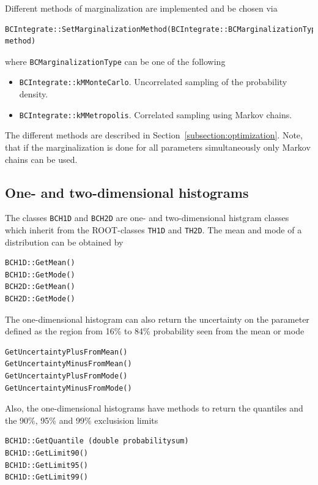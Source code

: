 \documentclass[11pt, a4paper]{article}
\begin{document}
\noindent 
Different methods of marginalization are implemented and be chosen via
%
\begin{verbatim}
BCIntegrate::SetMarginalizationMethod(BCIntegrate::BCMarginalizationType method)
\end{verbatim} 

\noindent
where \verb|BCMarginalizationType| can be one of the following 
% 
\begin{itemize}
\item \verb|BCIntegrate::kMMonteCarlo|. Uncorrelated sampling of the
 probability density.  
\item \verb|BCIntegrate::kMMetropolis|. Correlated sampling using
 Markov chains.
\end{itemize} 

\noindent 
The different methods are described in
Section~\ref{subsection:optimization}. Note, that if the
marginalization is done for all parameters simultaneously only Markov
chains can be used. \\


\subsection{One- and two-dimensional histograms} 

The classes \verb|BCH1D| and \verb|BCH2D| are one- and two-dimensional
histgram classes which inherit from the ROOT-classes \verb|TH1D| and
\verb|TH2D|. The mean and mode of a distribution can be obtained by 
%
\begin{verbatim}
BCH1D::GetMean()
BCH1D::GetMode()
BCH2D::GetMean()
BCH2D::GetMode()
\end{verbatim} 

\noindent 
The one-dimensional histogram can also return the uncertainty on the
parameter defined as the region from 16\% to 84\% probability seen
from the mean or mode
%
\begin{verbatim}
GetUncertaintyPlusFromMean()
GetUncertaintyMinusFromMean()
GetUncertaintyPlusFromMode()
GetUncertaintyMinusFromMode()
\end{verbatim} 

\noindent 
Also, the one-dimensional histograms have methods to return the
quantiles and the 90\%, 95\% and 99\% exclusision limits
%
\begin{verbatim} 
BCH1D::GetQuantile (double probabilitysum)
BCH1D::GetLimit90()
BCH1D::GetLimit95()
BCH1D::GetLimit99()
\end{verbatim} 
\end{document}
